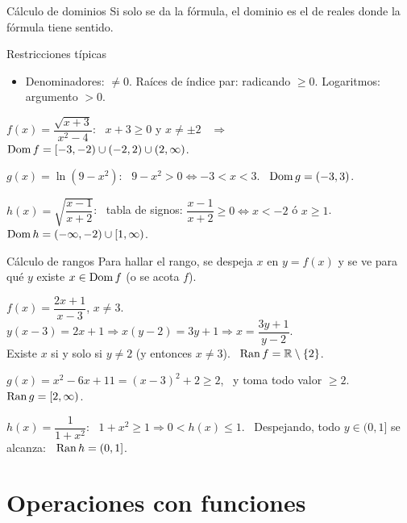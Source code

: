 \documentclass[10pt,aspectratio=169]{beamer}
\begin{document}
\begin{frame}{Cálculo de dominios}
  Si solo se da la fórmula, el dominio es el  de reales donde la fórmula tiene sentido.
  \begin{block}{Restricciones típicas}
    \begin{itemize}
      \item Denominadores: $\neq0$. \quad Raíces de índice par: radicando $\ge0$. \quad Logaritmos: argumento $>0$.
    \end{itemize}
  \end{block}
  \begin{ejemplo}[1]
    $f(x)=\dfrac{\sqrt{x+3}}{x^2-4}$: \ $x+3\ge0$ y $x\neq\pm2$ \ $\Rightarrow$ \ $\operatorname{Dom} f=[-3,-2)\cup(-2,2)\cup(2,\infty)$.
  \end{ejemplo}
  \begin{ejemplo}[2]
    $g(x)=\ln(9-x^2)$: \ $9-x^2>0\iff-3<x<3$. \ $\operatorname{Dom} g=(-3,3)$.
  \end{ejemplo}
  \begin{ejemplo}[3]
    $h(x)=\sqrt{\dfrac{x-1}{x+2}}$: \ tabla de signos: $\dfrac{x-1}{x+2}\ge0\iff x<-2$ ó $x\ge1$. \ $\operatorname{Dom} h=(-\infty,-2)\cup[1,\infty)$.
  \end{ejemplo}
\end{frame}

\begin{frame}{Cálculo de rangos}
  Para hallar el rango, se despeja $x$ en $y=f(x)$ y se ve para qué $y$ existe $x\in\operatorname{Dom} f$ (o se acota $f$).
  \begin{ejemplo}[4]
    $f(x)=\dfrac{2x+1}{x-3}$, $x\neq3$. \ $y(x-3)=2x+1\Rightarrow x(y-2)=3y+1\Rightarrow x=\dfrac{3y+1}{y-2}$.\\
    Existe $x$ si y solo si $y\neq2$ (y entonces $x\ne3$). \ $\operatorname{Ran} f=\mathbb{R}\setminus\{2\}$.
  \end{ejemplo}
  \begin{ejemplo}
    $g(x)=x^2-6x+11=(x-3)^2+2\ge2$, \ y toma todo valor $\ge2$. \ $\operatorname{Ran} g=[2,\infty)$.
  \end{ejemplo}
  \begin{ejemplo}[6: acotando]
    $h(x)=\dfrac{1}{1+x^2}$: \ $1+x^2\ge1\Rightarrow0<h(x)\le1$. \ Despejando, todo $y\in(0,1]$ se alcanza: \ $\operatorname{Ran} h=(0,1]$.
  \end{ejemplo}
\end{frame}

\section{Operaciones con funciones}
\end{document}
